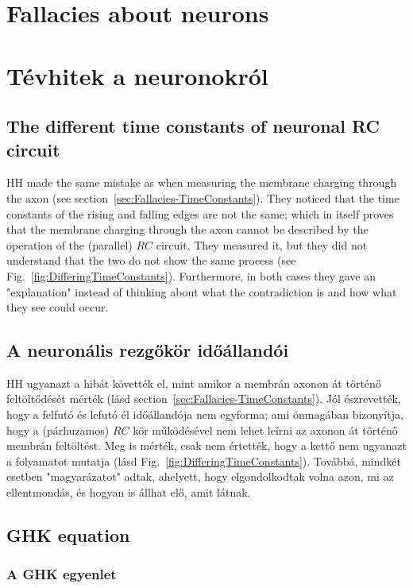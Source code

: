 
\ifx\magyar\undefined
\chapter[Fallacies about neurons]{Fallacies about neurons\label{ch:Fallacies}}
\else
\chapter[Tévhitek a neuronokról]{Tévhitek a neuronokról\label{ch:Fallacies}}
\fi
\iflatexml
\else
\minitoc
\fi


\ifx\magyar\undefined %

\section[The different time constants]
{The different time constants of neuronal RC circuit\label{sec:Fallacies-TimeConstants}}
\gls{HH} made the same mistake as when measuring the membrane charging through the axon (see section~\ref{sec:Fallacies-TimeConstants}).
They noticed that the time constants of the rising and falling edges are not the same; which in itself proves that the membrane charging through the axon cannot be described by the operation of the (parallel) $RC$ circuit.
They measured it, but they did not understand that the two do not show the same process (see Fig.~\ref{fig:DifferingTimeConstants}).
 Furthermore, in both cases they gave an "explanation" instead of thinking about what the contradiction is and how what they see could occur.


\else %

\section[A neuronális rezgőkör időállandói]
{A neuronális rezgőkör időállandói\label{sec:Fallacies-TimeConstants}}

\gls{HH} ugyanazt a hibát követték el, mint amikor a membrán axonon át történő feltöltődését mérték (lásd section~\ref{sec:Fallacies-TimeConstants}). Jól észrevették, hogy a felfutó és lefutó él időállandója nem egyforma; ami önmagában bizonyítja, hogy a (párhuzamos) $RC$ kör
működésével nem lehet leírni az axonon át történő membrán feltöltést. Meg is mérték, csak nem értették, hogy a kettő nem ugyanazt a folyamatot mutatja (lásd Fig.~\ref{fig:DifferingTimeConstants}). Továbbá, mindkét esetben "magyarázatot" adtak, ahelyett, hogy elgondolkodtak volna azon, mi az ellentmondás, és hogyan is állhat elő, amit látnak.
\fi

\ifx\magyar\undefined %

\section[GHK equation]{GHK equation\label{sec:Fallacies-GHKEquation}}

\else %

\subsection[GHK egyenlet]{A GHK egyenlet\label{sec:Fallacies-GHKEquation}}

\fi
